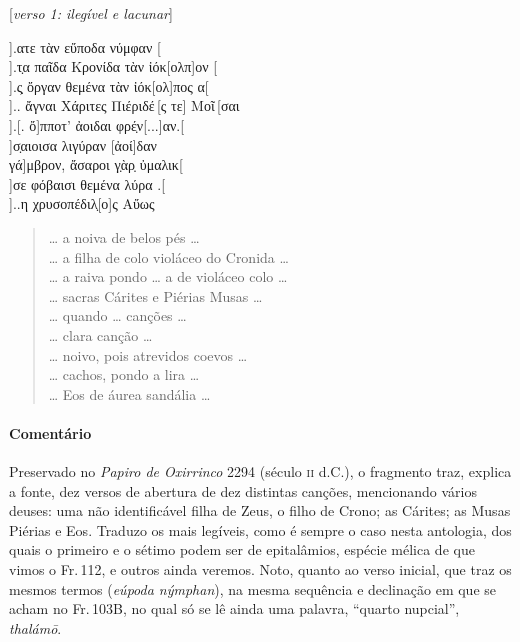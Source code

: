 \begin{gkverse}
\textnormal{[\textit{verso 1: ilegível e lacunar}]}

].ατε τὰν εὔποδα νύμφαν [\\[8pt]
].τ̣α παῖδα Κρονίδα τὰν ἰόκ[ολπ]ον [\\[8pt]
].ς̣ ὄργαν θεμένα τὰν ἰόκ[ολ]πος α[\\[8pt]
 ].. ἄγναι Χάριτες Πιέριδέ\,[ς τε] Μοῖ\,[σαι\\[8pt]
     ].[. ὄ]πποτ’ ἀοιδαι φρέ̣ν[...]αν.[\\[8pt]
             ]σ̣αιοισα λιγύραν [ἀοί]δαν\\[8pt]
         γά]μβρον, ἄσαροι γ̣ὰρ̣ ὐμαλικ[\\[8pt]
  ]σε φόβαισι θεμένα λύρα .[\\[8pt]
  ]..η χρυσοπέδιλ̣[ο]ς Αὔως
\end{gkverse}

\begin{verse}
\ldots{} a noiva de belos pés \ldots{}\\[8pt]
\ldots{} a filha de colo violáceo do Cronida \ldots{}\\[8pt]
\ldots{} a raiva pondo \ldots{} a de violáceo colo \ldots{}\\[8pt]
\ldots{} sacras Cárites e Piérias Musas \ldots{}\\[8pt]
\ldots{} quando \ldots{} canções \ldots{}\\[8pt]
\ldots{} clara canção \ldots{}\\[8pt]
\ldots{} noivo, pois atrevidos coevos \ldots{}\\[8pt]
\ldots{} cachos, pondo a lira \ldots{}\\[8pt]
\ldots{} Eos de áurea sandália \ldots{}\\[8pt]
\end{verse}

\medskip

{\paragraph{Comentário} Preservado  no \textit{Papiro de Oxirrinco} 2294 (século \textsc{ii} d.C.), o fragmento traz, explica a fonte, dez versos de abertura de dez distintas canções, mencionando vários deuses: uma não identificável filha de Zeus, o filho de Crono; as Cárites; as Musas Piérias e Eos. Traduzo os mais legíveis, como é sempre o caso nesta antologia, dos quais o primeiro e o sétimo podem ser de epitalâmios, espécie mélica de que vimos o Fr.\,112, e outros ainda veremos.
Noto, quanto ao verso inicial, que traz os mesmos termos (\textit{eúpoda nýmphan}), na mesma sequência e declinação em que se acham no Fr.\,103B, no qual só se lê ainda uma palavra, ``quarto nupcial'', \textit{thalámō}.}


